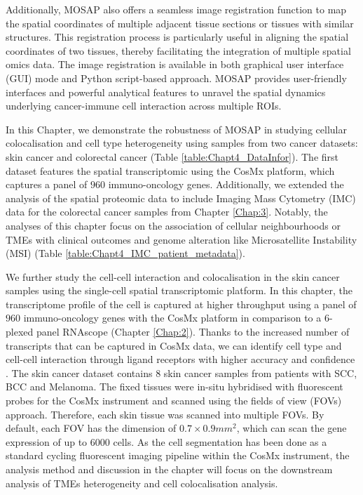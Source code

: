 Additionally, MOSAP also offers a seamless image registration function to map the spatial coordinates of multiple adjacent tissue sections or tissues with similar structures. This registration process is particularly useful in aligning the spatial coordinates of two tissues, thereby facilitating the integration of multiple spatial omics data. The image registration is available in both graphical user interface (GUI) mode and Python script-based approach. MOSAP provides user-friendly interfaces and powerful analytical features to unravel the spatial dynamics underlying cancer-immune cell interaction across multiple ROIs.

In this Chapter, we demonstrate the robustness of MOSAP in studying cellular colocalisation and cell type heterogeneity using samples from two cancer datasets: skin cancer and colorectal cancer (Table \ref{table:Chapt4_DataInfor}). The first dataset features the spatial transcriptomic using the CosMx platform, which captures a panel of $960$ immuno-oncology genes. Additionally, we extended the analysis of the spatial proteomic data to include Imaging Mass Cytometry (IMC) data for the colorectal cancer samples from Chapter \ref{Chap:3}. Notably, the analyses of this chapter focus on the association of cellular neighbourhoods or TMEs with clinical outcomes and genome alteration like Microsatellite Instability (MSI) (Table \ref{table:Chapt4_IMC_patient_metadata}). 

We further study the cell-cell interaction and colocalisation in the skin cancer samples using the single-cell spatial transcriptomic platform. In this chapter, the transcriptome profile of the cell is captured at higher throughput using a panel of $960$ immuno-oncology genes with the CosMx platform in comparison to a 6-plexed panel RNAscope (Chapter \ref{Chap:2}). Thanks to the increased number of transcripts that can be captured in CosMx data, we can identify cell type and cell-cell interaction through ligand receptors with higher accuracy and confidence \cite{he2022high}. The skin cancer dataset contains $8$ skin cancer samples from patients with SCC, BCC and Melanoma. The fixed tissues were in-situ hybridised with fluorescent probes for the CosMx instrument and scanned using the fields of view (FOVs) approach. Therefore, each skin tissue was scanned into multiple FOVs. By default, each FOV has the dimension of $0.7 \times 0.9 mm^{2}$, which can scan the gene expression of up to $6000$ cells. As the cell segmentation has been done as a standard cycling fluorescent imaging pipeline within the CosMx instrument, the analysis method and discussion in the chapter will focus on the downstream analysis of TMEs heterogeneity and cell colocalisation analysis.


